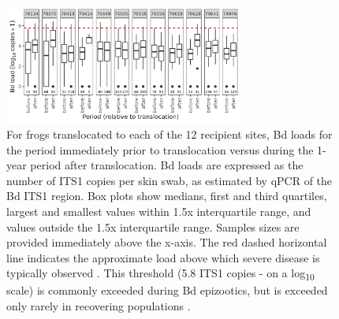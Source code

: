 \documentclass[9pt,twoside,lineno]{pnas-new-SI}
\begin{document}
\begin{figure}

{\centering \includegraphics[width=0.7\textwidth]{figures/bdload_beforeafter.png}

}

\caption{\label{fig-bdload-beforeafter}For frogs translocated to each of
the 12 recipient sites, Bd loads for the period immediately prior to
translocation versus during the 1-year period after translocation. Bd
loads are expressed as the number of ITS1 copies per skin swab, as
estimated by qPCR of the Bd ITS1 region. Box plots show medians, first
and third quartiles, largest and smallest values within 1.5x
interquartile range, and values outside the 1.5x interquartile range.
Samples sizes are provided immediately above the x-axis. The red dashed
horizontal line indicates the approximate load above which severe
disease is typically observed \citep{vredenburg2010}. This threshold
(5.8 ITS1 copies - on a log\textsubscript{10} scale) is commonly
exceeded during Bd epizootics, but is exceeded only rarely in recovering
populations \citep{briggs2010}.}

\end{figure}\clearpage

\newpage
\end{document}
